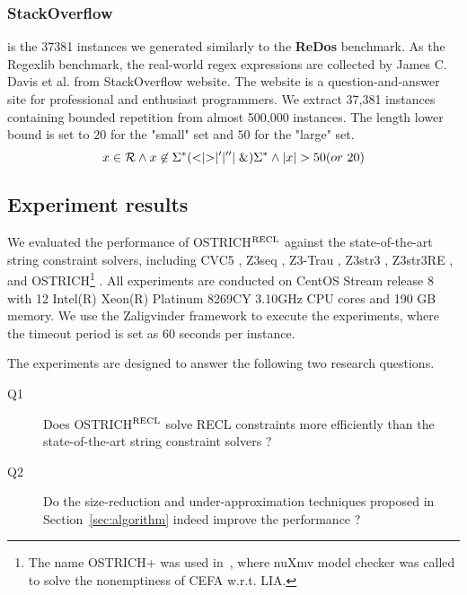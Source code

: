 {\subsubsection{StackOverflow} is the 37381 instances we generated similarly to the \textbf{ReDos} benchmark. As the Regexlib benchmark, the real-world regex expressions are collected by James C. Davis et al.\cite{regex_lingua_franca} from StackOverflow website\cite{stackoverflow}. The website is a question-and-answer site for professional and enthusiast programmers. We extract 37,381 instances containing bounded repetition from almost 500,000 instances. The length lower bound is set to $20$ for the "small" set and $50$ for the "large" set.
\begin{equation} \label{eq:template}
  x\in \mathcal{R} \wedge x\not\in \Sigma^*(<\mid >\mid '\mid ''\mid \&)\Sigma^*\wedge |x| > 50(or \ 20)
\end{equation}
}

\subsection{Experiment results}

We evaluated the performance of OSTRICH$^{\rm RECL}$ against the state-of-the-art string constraint solvers, including CVC5 
\cite{cvc5}, Z3seq \cite{z3seq}, Z3-Trau 
\cite{z3trau}, Z3str3
\cite{z3str3}, Z3str3RE \cite{z3str3re}, and OSTRICH\footnote{The name OSTRICH+ was used in~\cite{atva2020}, where nuXmv model checker was called to solve the nonemptiness of CEFA w.r.t. LIA. } 
\cite{atva2020}. All experiments are conducted on CentOS Stream release 8 with 12 Intel(R) Xeon(R) Platinum 8269CY 3.10GHz CPU cores and 190 GB memory. We use the Zaligvinder framework \cite{zaligvinder_2021} to execute the experiments, where the timeout period is set as 60 seconds per instance. 

The experiments are designed to answer the following two research questions. 
\begin{description}
\item[Q1] Does OSTRICH$^{\rm RECL}$ solve RECL constraints more efficiently than the state-of-the-art string constraint solvers ?

\item[Q2] Do the size-reduction and under-approximation techniques proposed in Section~\ref{sec:algorithm} indeed improve the performance ?
\end{description}

